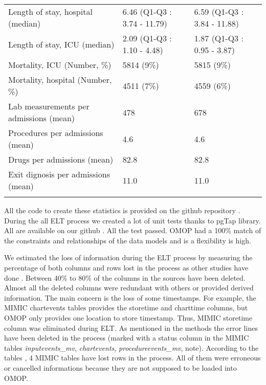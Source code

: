 \begin{table*}[t]
\begin{tabular}{@{}lll@{}}
Length of stay, hospital (median)      & 6.46 (Q1-Q3 : 3.74 - 11.79) & 6.59 (Q1-Q3 : 3.84 - 11.88)        \\
Length of stay, ICU (median)           & 2.09 (Q1-Q3 : 1.10 - 4.48)  & 1.87 (Q1-Q3 : 0.95 - 3.87)         \\
Mortality, ICU (Number, \%)            & 5814 (9\%)                  & 5815 (9\%)                         \\
Mortality, hospital (Number, \%)       & 4511 (7\%)                  & 4559 (6\%)                         \\
Lab measurements per admissions (mean) & 478                         & 678                                \\
Procedures per admissions (mean)       & 4.6                         & 4.6                                \\
Drugs per admissions (mean)            & 82.8                        & 82.8                               \\
Exit dignosis per admissions (mean)    & 11.0                        & 11.0                               \\\botrule
\end{tabular}
\label{table:statistics}
\end{table*}

All the code to create these statistics is provided on the github repository
\cite{mimic-omop-website}. During the all ELT process we created a lot of unit
tests thanks to pgTap library.  All are available on our github
\cite{mimic-omop-website}. All the test passed. OMOP had a 100\% match of the
constraints and relationships of the data models and is a flexibility is high. 

%
%
We estimated the loss of information during the ELT process by measuring the
percentage of both columns and rows lost in the process as other studies have
done \cite{omop-nashville}.
Between 40\% to 80\% of the columns in the sources have been deleted. Almost
all the deleted columns were redundant with others or provided derived
information. The main concern is the loss of some timestamps. For example, the
MIMIC chartevents tables provides the storetime and charttime columns, but OMOP
only provides one location to store timestamp. Thus, MIMIC storetime column was
eliminated during ELT. As mentioned in the methods the error lines have been
deleted in the process (marked with a status column in the MIMIC tables
\textit{inputevents\_mv}, \textit{chartevents}, \textit{procedureevents\_mv}, note).
According to the tables \cite{lostrows}, 4 MIMIC tables have lost rows in the
process. All of them were erroneous or cancelled informations because they are
not supposed to be loaded into OMOP.

